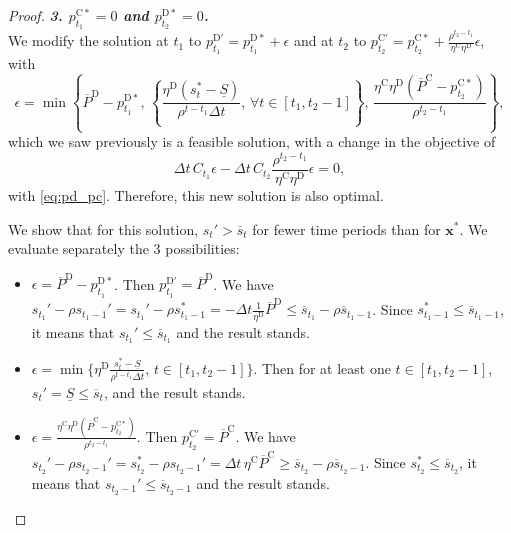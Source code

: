 \documentclass[10pt,a4paper]{amsart}
\newcommand{\up}[1]{^{\mathrm{#1}}}
\begin{document}
\begin{proof}
    \textit{\textbf{3. $p_{t_1}\up{C*}=0$ and $p_{t_2}\up{D*}=0$.}} \\
    We modify the solution at $t_1$ to ${p}\up{D'}_{t_1}={p}\up{D*}_{t_1}+{\epsilon}$ and at $t_2$ to ${p}\up{C'}_{t_2}={p}\up{C*}_{t_2}+\frac{\rho^{t_2 - t_1}}{\eta\up{C} \eta\up{D}}\epsilon$, with
        \begin{equation} \label{eq:epsilon_3}
            \epsilon = \min \left\{\overline{P}\up{D} - {p}\up{D*}_{t_1}, \, \left\{  \frac{\eta\up{D}({s}_t^* - \underline{S})}{\rho^{t - t_1} \Delta t}, \, \forall t \in [t_1,t_2-1] \right\} , \, \frac{\eta\up{C} \eta\up{D} (\overline{P}\up{C} - p\up{C*}_{t_2})}{\rho^{t_2 - t_1}} \right\},
        \end{equation}
        which we saw previously is a feasible solution, with a change in the objective of
        \begin{equation}
            \Delta t \, C_{t_1} \epsilon - \Delta t \, C_{t_2} \frac{\rho^{t_2 - t_1}}{\eta\up{C} \eta\up{D}} \epsilon = 0,
        \end{equation}
        with \eqref{eq:pd_pc}. Therefore, this new solution is also optimal.
        
        We show that for this solution, $s_t' > \overline{s}_t$ for fewer time periods than for $\mathbf{x}^*$.
        We evaluate separately the 3 possibilities:
        \begin{itemize}
            \item ${\epsilon} = \overline{P}\up{D} - {p}\up{D*}_{t_1}$. Then $p\up{D'}_{t_1} = \overline{P}\up{D}$. We have $s_{t_1}'- \rho s_{t_1-1}' = s_{t_1}' - \rho s_{t_1-1}^* = - \Delta t \frac{1}{\eta\up{D}} \overline{P}\up{D} \leq \overline{s}_{t_1} - \rho \overline{s}_{t_1-1}$. Since $s_{t_1-1}^* \leq \overline{s}_{t_1-1}$, it means that $s_{t_1}' \leq \overline{s}_{t_1}$ and the result stands.
            \item ${\epsilon} = \min \{ \eta\up{D} \frac{{s}_t^* - \underline{S}}{\rho^{t - t_1} \Delta t}, \, t \in [t_1, t_2-1] \}$. Then for at least one $t \in [t_1, t_2-1]$, $s_t'= \underline{S} \leq \overline{s}_t$, and the result stands.
            \item ${\epsilon} = \frac{\eta\up{C} \eta\up{D} (\overline{P}\up{C} - p\up{C*}_{t_2})}{\rho^{t_2 - t_1}}$. Then ${p}\up{C'}_{t_2} = \overline{P}\up{C}$. We have $s_{t_2}'- \rho s_{t_2-1}' = s_{t_2}^* - \rho s_{t_2-1}' = \Delta t \, \eta\up{C} \overline{P}\up{C} \geq \overline{s}_{t_2} - \rho \overline{s}_{t_2-1}$. Since $s_{t_2}^* \leq \overline{s}_{t_2}$, it means that $s_{t_2-1}' \leq \overline{s}_{t_2-1}$ and the result stands.
        \end{itemize}


\end{proof}
\end{document}
